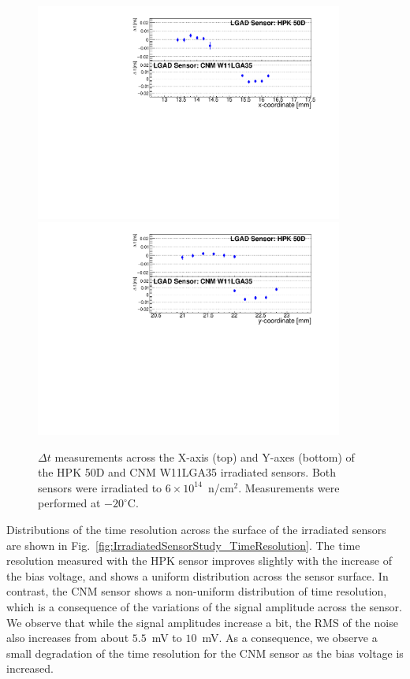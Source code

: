\documentclass[preprint,1p]{elsarticle}
\begin{document}
\begin{figure}[htbp] 
\centering
\includegraphics[width=0.9\textwidth]{figs/USCSBoard_HPK50DIrradiated-CNMW11LGA35_Run936-961/IrradiatedSensorStudy_MeanTime_vs_X.pdf} 
\includegraphics[width=0.9\textwidth]{figs/USCSBoard_HPK50DIrradiated-CNMW11LGA35_Run936-961/IrradiatedSensorStudy_MeanTime_vs_Y.pdf} 
\caption{$\Delta{t}$ measurements across the X-axis (top) and Y-axes (bottom) of the HPK 50D and CNM W11LGA35 irradiated sensors. Both sensors were irradiated to $6\times 10^{14}$~n/cm$^2$. Measurements were performed at $-20^{\circ}$C.} 
\label{fig:IrradiatedSensorStudy_MeanTime} 
\end{figure} 

Distributions of the time resolution across the surface of the irradiated
sensors are shown in Fig.~\ref{fig:IrradiatedSensorStudy_TimeResolution}. The time
resolution measured with the HPK sensor improves slightly with the increase of
the bias voltage, and shows a uniform distribution across the sensor surface. In
contrast, the CNM sensor shows a non-uniform distribution of time resolution,
which is a consequence of the variations of the signal amplitude across the
sensor. We observe that while the signal amplitudes increase a bit, the RMS of the
noise also increases from about $5.5$~mV to $10$~mV. As a consequence, we observe a small degradation 
of the time resolution for the CNM sensor as the bias voltage is increased.
\end{document}
